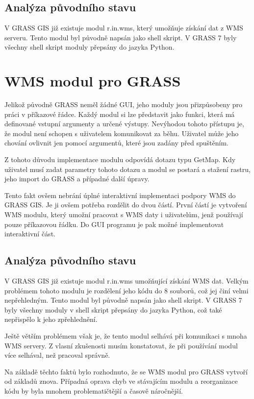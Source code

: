 \documentclass[a4paper,12pt]{article}
\begin{document}
\subsection{Analýza původního stavu}

 V GRASS GIS již existuje modul r.in.wms, který umožňuje získání dat z WMS serveru. Tento modul byl původně napsán jako shell skript. V GRASS 7 byly všechny shell skript moduly přepsány do jazyka Python.      

\section{WMS modul pro GRASS}

Jelikož původně GRASS neměl žádné GUI, jeho moduly jsou přizpůsobeny pro práci v příkazové řádce. Každý modul si lze představit jako funkci, která má definované vstupní argumenty a určené výstupy. Nevýhodou tohoto 
přístupu je, že modul není schopen s uživatelem komunikovat za běhu. Uživatel může jeho chování ovlivnit jen pomocí argumentů, které jsou zadány před spuštěním.

Z tohoto důvodu implementace modulu odpovídá dotazu typu GetMap. Kdy uživatel musí zadat parametry tohoto dotazu a modul se postará a stažení rastru, jeho import do GRASS a případné další úpravy. 


Tento fakt ovšem nebrání úplné interaktivní implementaci podpory WMS do GRASS GIS. Je ji ovšem potřeba rozdělit do dvou částí. První částí je vytvoření WMS modulu, který umožní pracovat s WMS daty i uživatelům, jenž používají
pouze příkazovou řádku.  Do GUI programu je pak možné implementovat interaktivní část.


\subsection{Analýza původního stavu}

 V GRASS GIS již existuje modul r.in.wms umožňující získání WMS dat.
Velkým problémem tohoto modulu je rozdělení jeho kódu do 8 souborů, což jej činí velmi nepřehledným. 
Tento modul byl původně napsán jako shell skript. V GRASS 7 byly všechny moduly v shell skript  přepsány do jazyka Python, což také nepřispělo k jeho zpřehlednění. 

Ještě větším problémem však je, že tento modul selhává při komunikaci s mnoha WMS servery. Z vlasní zkušenosti musím konstatovat, že při používání modul více selhával, než pracoval správně.

Na základě těchto faktů bylo rozhodnuto, že se WMS modul pro GRASS vytvoří od základů znova. Případná oprava chyb ve stávajícím modulu a reorganizace kódu by byla mnohem problematičtější a časově náročnější.
\end{document}
